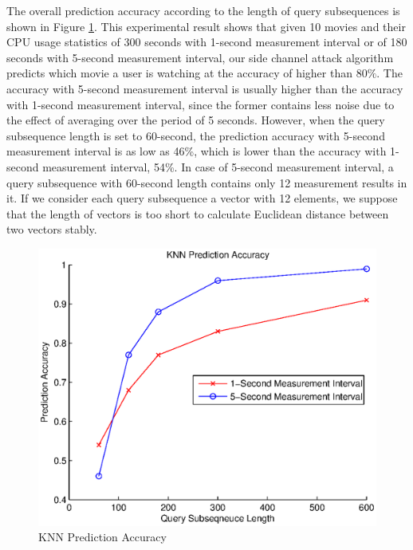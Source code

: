 The overall prediction accuracy according to the length of query subsequences is shown in Figure \ref{fig:knn_result}.
This experimental result shows that given 10 movies and their CPU usage statistics of 300 seconds with 1-second measurement interval or of 180 seconds with 5-second measurement interval, our side channel attack algorithm predicts which movie a user is watching at the accuracy of higher than 80$\%$.
The accuracy with 5-second measurement interval is usually higher than the accuracy with 1-second measurement interval, since the former contains less noise due to the effect of averaging over the period of 5 seconds. 
However, when the query subsequence length is set to 60-second, the prediction accuracy with 5-second measurement interval is as low as 46\%, which is lower than the accuracy with 1-second measurement interval, 54\%. 
In case of 5-second measurement interval, a query subsequence with 60-second length contains only 12 measurement results in it. 
If we consider each query subsequence a vector with 12 elements, we suppose that the length of vectors is too short to calculate Euclidean distance between two vectors stably. 


\begin{figure}[h]
\centering
\includegraphics[scale=0.40]{Figures/knn_result}
\caption{KNN Prediction Accuracy}
\label{fig:knn_result}
\vspace{-5mm}
\end{figure}